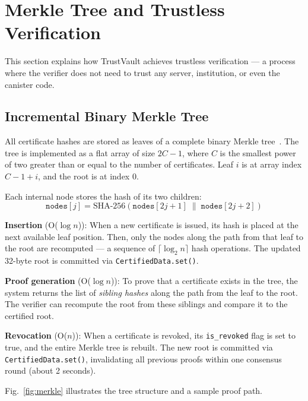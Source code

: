 \documentclass[journal]{IEEEtran}
\begin{document}
\section{Merkle Tree and Trustless Verification}
\label{sec:merkle}

This section explains how TrustVault achieves trustless verification — a process where the verifier does not need to trust any server, institution, or even the canister code.

\subsection{Incremental Binary Merkle Tree}

All certificate hashes are stored as leaves of a complete binary Merkle tree~\cite{merkle1989certified}. The tree is implemented as a flat array of size $2C - 1$, where $C$ is the smallest power of two greater than or equal to the number of certificates. Leaf $i$ is at array index $C - 1 + i$, and the root is at index 0.

Each internal node stores the hash of its two children:
\begin{equation}
  \texttt{nodes}[j] = \text{SHA-256}(\texttt{nodes}[2j+1] \;\|\; \texttt{nodes}[2j+2])
  \label{eq:merkle}
\end{equation}

\textbf{Insertion} (O($\log n$)): When a new certificate is issued, its hash is placed at the next available leaf position. Then, only the nodes along the path from that leaf to the root are recomputed — a sequence of $\lceil\log_2 n\rceil$ hash operations. The updated 32-byte root is committed via \texttt{CertifiedData.set()}.

\textbf{Proof generation} (O($\log n$)): To prove that a certificate exists in the tree, the system returns the list of \emph{sibling hashes} along the path from the leaf to the root. The verifier can recompute the root from these siblings and compare it to the certified root.

\textbf{Revocation} (O($n$)): When a certificate is revoked, its \texttt{is\_revoked} flag is set to true, and the entire Merkle tree is rebuilt. The new root is committed via \texttt{CertifiedData.set()}, invalidating all previous proofs within one consensus round (about 2 seconds).

Fig.~\ref{fig:merkle} illustrates the tree structure and a sample proof path.
\end{document}
